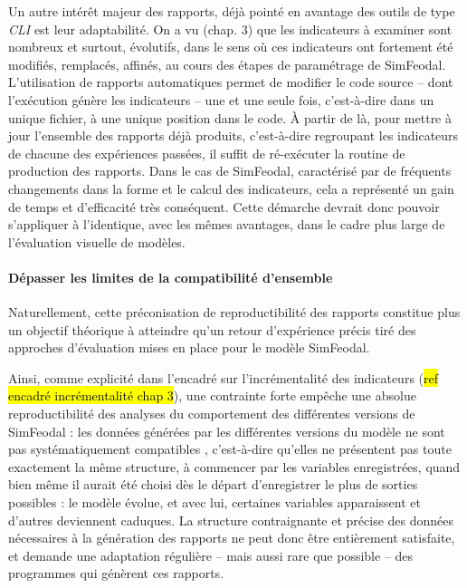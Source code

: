 	Un autre intérêt majeur des rapports, déjà pointé en avantage des outils de type \textit{CLI} est leur adaptabilité.
	On a vu (chap. 3) que les indicateurs à examiner sont nombreux et surtout, évolutifs, dans le sens où ces indicateurs ont fortement été modifiés, remplacés, affinés, au cours des étapes de paramétrage de SimFeodal.
	L'utilisation de rapports automatiques permet de modifier le code source -- dont l'exécution génère les indicateurs -- une et une seule fois, c'est-à-dire dans un unique fichier, à une unique position dans le code.
	À partir de là, pour mettre à jour l'ensemble des rapports déjà produits, c'est-à-dire regroupant les indicateurs de chacune des expériences passées, il suffit de ré-exécuter la routine de production des rapports.
	Dans le cas de SimFeodal, caractérisé par de fréquents changements dans la forme et le calcul des indicateurs, cela a représenté un gain de temps et d'efficacité très conséquent.
	Cette démarche devrait donc pouvoir s'appliquer à l'identique, avec les mêmes avantages, dans le cadre plus large de l'évaluation visuelle de modèles.

%
%


	\paragraph{Dépasser les limites de la compatibilité d'ensemble}
	Naturellement, cette préconisation de reproductibilité des rapports constitue plus un objectif théorique à atteindre qu'un retour d'expérience précis tiré des approches d'évaluation mises en place pour le modèle SimFeodal.
	
	Ainsi, comme explicité dans l'encadré sur l'incrémentalité des indicateurs (\hl{ref encadré incrémentalité chap 3}), une contrainte forte empêche une absolue reproductibilité des analyses du comportement des différentes versions de SimFeodal : les données générées par les différentes versions du modèle ne sont pas systématiquement \og compatibles \fg{}, c'est-à-dire qu'elles ne présentent pas toute exactement la même structure, à commencer par les variables enregistrées, quand bien même il aurait été choisi dès le départ d'enregistrer le plus de sorties possibles : le modèle évolue, et avec lui, certaines variables apparaissent et d'autres deviennent caduques.
	La structure contraignante et précise des données nécessaires à la génération des rapports ne peut donc être entièrement satisfaite, et demande une adaptation régulière -- mais aussi rare que possible -- des programmes qui génèrent ces rapports.
	
